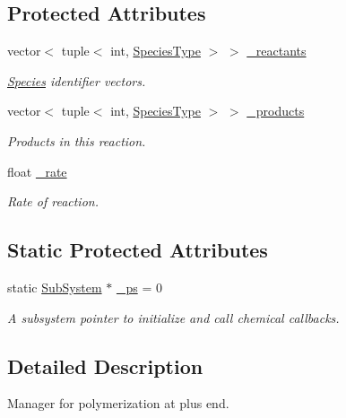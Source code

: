 \subsection*{Protected Attributes}
\begin{DoxyCompactItemize}
\item 
vector$<$ tuple$<$ int, \hyperlink{Species_8h_a50651af47c56ea0e27235468d23542cf}{Species\+Type} $>$ $>$ \hyperlink{classInternalFilamentRxnManager_a63de9061c3da4ad03cf4c530d2774979}{\+\_\+reactants}
\begin{DoxyCompactList}\small\item\em \hyperlink{classSpecies}{Species} identifier vectors. \end{DoxyCompactList}\item 
vector$<$ tuple$<$ int, \hyperlink{Species_8h_a50651af47c56ea0e27235468d23542cf}{Species\+Type} $>$ $>$ \hyperlink{classInternalFilamentRxnManager_afd213da1a3706e2e88962e5da886a5dc}{\+\_\+products}
\begin{DoxyCompactList}\small\item\em Products in this reaction. \end{DoxyCompactList}\item 
float \hyperlink{classInternalFilamentRxnManager_a8b98dd9e6f5d016149f5434b891806df}{\+\_\+rate}
\begin{DoxyCompactList}\small\item\em Rate of reaction. \end{DoxyCompactList}\end{DoxyCompactItemize}
\subsection*{Static Protected Attributes}
\begin{DoxyCompactItemize}
\item 
static \hyperlink{classSubSystem}{Sub\+System} $\ast$ \hyperlink{classInternalFilamentRxnManager_a973ce9cc2aae811e6867afa46193c5f2}{\+\_\+ps} = 0
\begin{DoxyCompactList}\small\item\em A subsystem pointer to initialize and call chemical callbacks. \end{DoxyCompactList}\end{DoxyCompactItemize}


\subsection{Detailed Description}
Manager for polymerization at plus end. 


